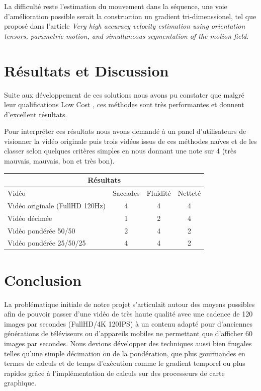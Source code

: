 \documentclass[fleqn,10pt]{SelfArx} %
\begin{document}
La difficulté reste l'estimation du mouvement dans la séquence,
une voie d'amélioration possible serait la construction un gradient tri-dimenssionel, 
tel que proposé dans l'article {\em Very high accuracy velocity estimation using orientation tensors, parametric motion, and simultaneous segmentation of the motion field}\cite{farneback2001}.

\section{Résultats et Discussion}
Suite aux développement de ces solutions nous avons pu constater que malgré leur qualifications \og Low Cost \fg{}, ces méthodes sont très performantes et donnent d'excellent résultats.

Pour interpréter ces résultats nous avons demandé à un panel d'utilisateurs de visionner la vidéo originale puis trois vidéos issus de ces méthodes naïves et de les classer selon quelques critères simples en nous donnant une note sur 4 (très mauvais, mauvais, bon et très bon).
\begin{center}

\begin{tabular}{|p{3cm}||c|c|c|}
  \hline
  \multicolumn{4}{|c|}{Résultats} \\
  \hline
  Vidéo & Saccades & Fluidité & Netteté\\ \hline
  Vidéo originale (FullHD 120Hz) & 4 & 4 & 4 \\ \hline
  Vidéo décimée & 1 & 2 & 4 \\ \hline
  Vidéo pondérée 50/50 & 2 & 4 & 2 \\ \hline
  Vidéo pondérée 25/50/25 & 4 & 4 & 2 \\ \hline
\end{tabular}

\end{center}


\section{Conclusion}
La problématique initiale de notre projet s'articulait autour des moyens possibles afin de pouvoir passer d'une vidéo de très haute qualité avec une cadence de 120 images par secondes (FullHD/4K 120IPS) à un contenu adapté pour d'anciennes générations de téléviseurs ou d'appareils mobiles ne permettant que d'afficher 60 images par secondes.
Nous devions développer des techniques aussi bien frugales telles qu'une simple décimation ou de la pondération, que plus gourmandes en termes de calculs et de temps d'exécution comme le gradient temporel ou plus rapides grâce à l'implémentation de calculs sur des processeurs de carte graphique.
\end{document}
